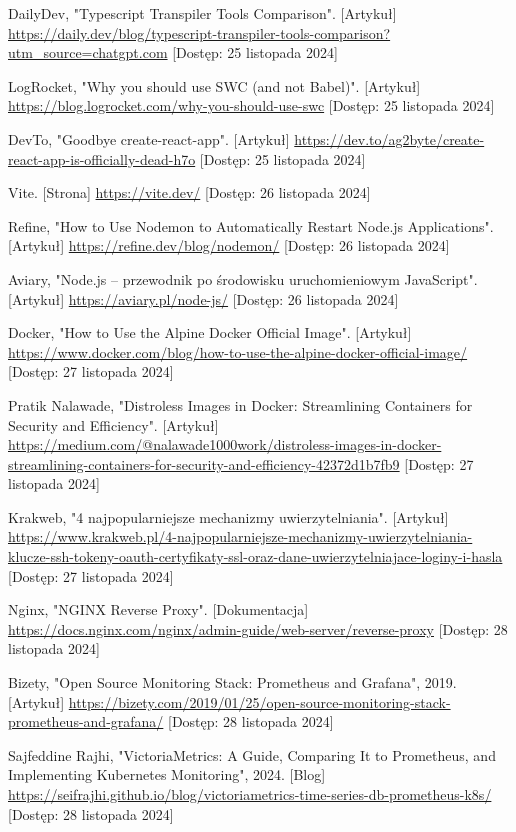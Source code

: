 \documentclass{article}
\begin{document}
\begin{thebibliography}{9}
DailyDev, "Typescript Transpiler Tools Comparison". [Artykuł] \url{https://daily.dev/blog/typescript-transpiler-tools-comparison?utm_source=chatgpt.com} [Dostęp: 25 listopada 2024]

LogRocket, "Why you should use SWC (and not Babel)". [Artykuł] \url{https://blog.logrocket.com/why-you-should-use-swc} [Dostęp: 25 listopada 2024]

DevTo, "Goodbye create-react-app". [Artykuł] \url{https://dev.to/ag2byte/create-react-app-is-officially-dead-h7o} [Dostęp: 25 listopada 2024]

Vite. [Strona] \url{https://vite.dev/} [Dostęp: 26 listopada 2024]

Refine, "How to Use Nodemon to Automatically Restart Node.js Applications". [Artykuł] \url{https://refine.dev/blog/nodemon/} [Dostęp: 26 listopada 2024]

Aviary, "Node.js – przewodnik po środowisku uruchomieniowym JavaScript". [Artykuł] \url{https://aviary.pl/node-js/} [Dostęp: 26 listopada 2024]

Docker, "How to Use the Alpine Docker Official Image". [Artykuł] \url{https://www.docker.com/blog/how-to-use-the-alpine-docker-official-image/} [Dostęp: 27 listopada 2024]

Pratik Nalawade, "Distroless Images in Docker: Streamlining Containers for Security and Efficiency". [Artykuł] \url{https://medium.com/@nalawade1000work/distroless-images-in-docker-streamlining-containers-for-security-and-efficiency-42372d1b7fb9} [Dostęp: 27 listopada 2024]

Krakweb, "4 najpopularniejsze mechanizmy uwierzytelniania". [Artykuł] \url{https://www.krakweb.pl/4-najpopularniejsze-mechanizmy-uwierzytelniania-klucze-ssh-tokeny-oauth-certyfikaty-ssl-oraz-dane-uwierzytelniajace-loginy-i-hasla} [Dostęp: 27 listopada 2024]

Nginx, "NGINX Reverse Proxy". [Dokumentacja] \url{https://docs.nginx.com/nginx/admin-guide/web-server/reverse-proxy} [Dostęp: 28 listopada 2024]

Bizety, "Open Source Monitoring Stack: Prometheus and Grafana", 2019. [Artykuł] \url{https://bizety.com/2019/01/25/open-source-monitoring-stack-prometheus-and-grafana/} [Dostęp: 28 listopada 2024]

Sajfeddine Rajhi, "VictoriaMetrics: A Guide, Comparing It to Prometheus, and Implementing Kubernetes Monitoring", 2024. [Blog] \url{https://seifrajhi.github.io/blog/victoriametrics-time-series-db-prometheus-k8s/} [Dostęp: 28 listopada 2024]



\end{thebibliography}
\end{document}
